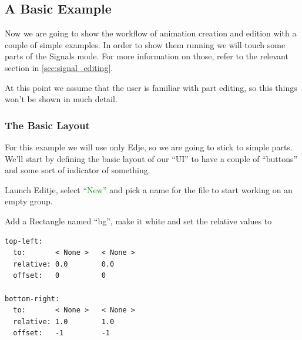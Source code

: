 \documentclass[a4paper]{profusion}
\newcommand{\GUIButton}[1]{\textcolor{green}{#1}} %
\begin{document}
\subsection{A Basic Example}

Now we are going to show the workflow of animation creation and edition
with a couple of simple examples. In order to show them running we will
touch some parts of the Signals mode. For more information on those,
refer to the relevant section in \ref{sec:signal_editing}.

At this point we assume that the user is familiar with part editing, so
this things won't be shown in much detail.

\subsubsection{The Basic Layout}

For this example we will use only Edje, so we are going to stick to simple
parts. We'll start by defining the basic layout of our ``UI'' to have a
couple of ``buttons'' and some sort of indicator of something.

Launch Editje, select \GUIButton{``New''} and pick a name for the
file to start working on an empty group.

Add a Rectangle named ``bg'', make it white and set the relative values to
\begin{verbatim}
top-left:
  to:       < None >   < None >
  relative: 0.0        0.0
  offset:   0          0

bottom-right:
  to:       < None >   < None >
  relative: 1.0        1.0
  offset:   -1         -1
\end{verbatim}
\end{document}
